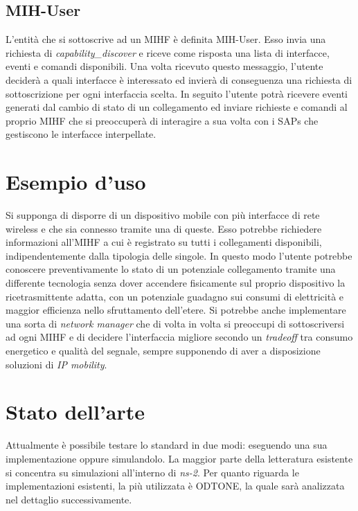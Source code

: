 \subsection{MIH-User}
L'entità che si sottoscrive ad un MIHF è definita MIH-User. Esso invia una richiesta di {\em capability\_discover} e riceve come risposta una lista di interfacce, eventi e comandi disponibili. Una volta ricevuto questo messaggio, l'utente deciderà a quali interfacce è interessato ed invierà di conseguenza una richiesta di sottoscrizione per ogni interfaccia scelta. In seguito l'utente potrà ricevere eventi generati dal cambio di stato di un collegamento ed inviare richieste e comandi al proprio MIHF che si preoccuperà di interagire a sua volta con i SAPs che gestiscono le interfacce interpellate.

\section{Esempio d'uso}
Si supponga di disporre di un dispositivo mobile con più interfacce di rete wireless e che sia connesso tramite una di queste. Esso potrebbe richiedere informazioni all'MIHF a cui è registrato su tutti i  collegamenti disponibili, indipendentemente dalla tipologia delle singole. In questo modo l'utente potrebbe conoscere preventivamente lo stato di un potenziale collegamento tramite una differente tecnologia senza dover accendere fisicamente sul proprio dispositivo la ricetrasmittente adatta, con un potenziale guadagno sui consumi di elettricità e maggior efficienza nello sfruttamento dell'etere. Si potrebbe anche implementare una sorta di {\em network manager} che di volta in volta si preoccupi di sottoscriversi ad ogni MIHF e di decidere l'interfaccia migliore secondo un {\em tradeoff} tra consumo energetico e qualità del segnale, sempre supponendo di aver a disposizione soluzioni di {\em IP mobility}.

\section{Stato dell'arte}
Attualmente è possibile testare lo standard in due modi: eseguendo una sua implementazione oppure simulandolo. La maggior parte della letteratura esistente si concentra su simulazioni all'interno di {\em ns-2}\cite{ns2}. Per quanto riguarda le implementazioni esistenti, la più utilizzata è ODTONE\cite{odtone}, la quale sarà analizzata nel dettaglio successivamente.